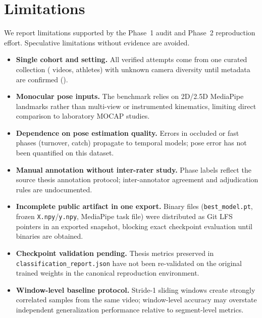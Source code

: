 \section{Limitations}
\label{sec:limitations}

We report limitations supported by the Phase~1 audit and Phase~2 reproduction effort.
Speculative limitations without evidence are avoided.

\begin{itemize}
  \item \textbf{Single cohort and setting.}
        All verified attempts come from one curated collection (\numvideos{} videos, \numathletes{} athletes) with unknown camera diversity until metadata are confirmed ().

  \item \textbf{Monocular pose inputs.}
        The benchmark relies on 2D/2.5D MediaPipe landmarks rather than multi-view or instrumented kinematics, limiting direct comparison to laboratory \acs{MOCAP} studies.

  \item \textbf{Dependence on pose estimation quality.}
        Errors in occluded or fast phases (turnover, catch) propagate to temporal models; pose error has not been quantified on this dataset.

  \item \textbf{Manual annotation without inter-rater study.}
        Phase labels reflect the source thesis annotation protocol; inter-annotator agreement and adjudication rules are undocumented.

  \item \textbf{Incomplete public artifact in one export.}
        Binary files (\texttt{best\_model.pt}, frozen \texttt{X.npy}/\texttt{y.npy}, MediaPipe task file) were distributed as Git LFS pointers in an exported snapshot, blocking exact checkpoint evaluation until binaries are obtained.

  \item \textbf{Checkpoint validation pending.}
        Thesis metrics preserved in \texttt{classification\_report.json} have not been re-validated on the original trained weights in the canonical reproduction environment.

  \item \textbf{Window-level baseline protocol.}
        Stride-1 sliding windows create strongly correlated samples from the same video; window-level accuracy may overstate independent generalization performance relative to segment-level metrics.


\end{itemize}
